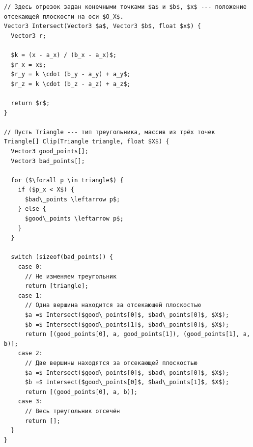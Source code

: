 \documentclass[a4paper,12pt]{report}
\numberwithin{equation}{section}
\begin{document}
\begin{lstlisting}[float=p,caption={Пересечение треугольника плоскостью},label=clip_algo]
// Здесь отрезок задан конечными точками $a$ и $b$, $x$ --- положение отсекающей плоскости на оси $O_X$.
Vector3 Intersect(Vector3 $a$, Vector3 $b$, float $x$) {
  Vector3 r;
  
  $k = (x - a_x) / (b_x - a_x)$;
  $r_x = x$;
  $r_y = k \cdot (b_y - a_y) + a_y$;
  $r_z = k \cdot (b_z - a_z) + a_z$;
  
  return $r$;
}

// Пусть Triangle --- тип треугольника, массив из трёх точек
Triangle[] Clip(Triangle triangle, float $X$) {
  Vector3 good_points[];
  Vector3 bad_points[];
  
  for ($\forall p \in triangle$) {
    if ($p_x < X$) {
      $bad\_points \leftarrow p$;
    } else {
      $good\_points \leftarrow p$;
    }
  }
  
  switch (sizeof(bad_points)) {
    case 0:
      // Не изменяем треугольник
      return [triangle];
    case 1:
      // Одна вершина находится за отсекающей плоскостью
      $a =$ Intersect($good\_points[0]$, $bad\_points[0]$, $X$);
      $b =$ Intersect($good\_points[1]$, $bad\_points[0]$, $X$);
      return [(good_points[0], a, good_points[1]), (good_points[1], a, b)];
    case 2:
      // Две вершины находятся за отсекающей плоскостью
      $a =$ Intersect($good\_points[0]$, $bad\_points[0]$, $X$);
      $b =$ Intersect($good\_points[0]$, $bad\_points[1]$, $X$);
      return [(good_points[0], a, b)];
    case 3:
      // Весь треугольник отсечён
      return [];
  }
}
\end{lstlisting}
\end{document}
